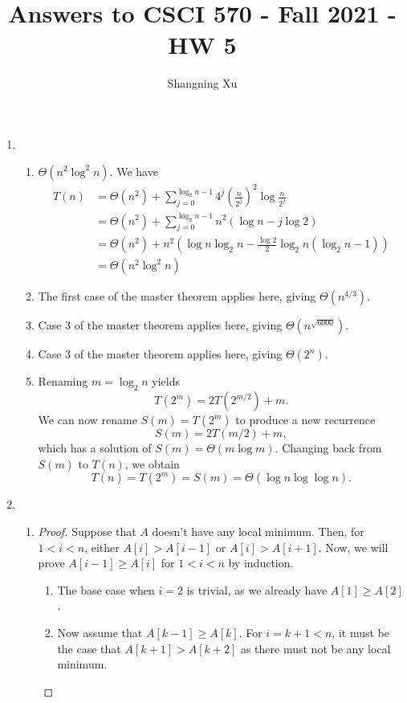 \documentclass{article}
\title{Answers to CSCI 570 - Fall 2021 - HW 5}
\author{Shangning Xu}
\begin{document}
\maketitle

\begin{enumerate}
    \item   
    \begin{enumerate}[label=\alph*)]
        \item $\Theta(n^2\log^2 n)$. We have
        \begin{align*}
            T(n) &= \Theta(n^2) + \sum_{j = 0}^{\log_2 n - 1} 4^j\left(\frac{n}{2^j}\right)^2 \log\frac{n}{2^j}\\
            &= \Theta(n^2) + \sum_{j = 0}^{\log_2 n - 1} n^2 (\log n - j\log 2)\\
            &= \Theta(n^2) + n^2(\log n\log_2 n - \frac{\log 2}{2}\log_2 n(\log_2 n - 1))\\
            &= \Theta(n^2\log^2 n)
        \end{align*}
        \item The first case of the master theorem applies here, giving $\Theta(n^{4/3})$.
        \item Case 3 of the master theorem applies here, giving $\Theta(n^{\sqrt{6000}})$.
        \item Case 3 of the master theorem applies here, giving $\Theta(2^n)$.
        \item Renaming $m = \log_2 n$ yields
        \[
            T(2^m) = 2T(2^{m/2}) + m.
        \]
        We can now rename $S(m) = T(2^m)$ to produce a new recurrence
        \[
            S(m) = 2T(m/2) + m,
        \]
        which has a solution of $S(m) = \Theta(m\log m)$. Changing back from $S(m)$ to $T(n)$, we obtain
        \[
            T(n) = T(2^m) = S(m) = \Theta(\log n\log\log n).
        \]
    \end{enumerate}

    \item
    \begin{enumerate}
        \item
        \begin{proof}
            Suppose that $A$ doesn't have any local minimum. Then, for $1 < i < n$, either $A[i] > A[i - 1]$ or $A[i] > A[i + 1]$. Now, we will prove $A[i - 1] \ge A[i]$ for $1 < i < n$ by induction.

            \begin{enumerate}
                \item The base case when $i = 2$ is trivial, as we already have $A[1] \ge A[2]$.
                \item Now assume that $A[k - 1] \ge A[k]$. For $i = k + 1 < n$, it must be the case that $A[k + 1] > A[k + 2]$ as there must not be any local minimum.
            \end{enumerate}


\end{proof}
\end{enumerate}
\end{enumerate}
\end{document}
